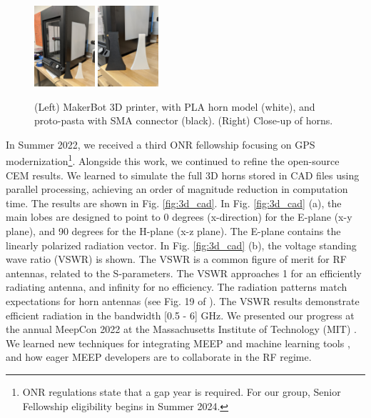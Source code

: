 \documentclass[../../main.tex]{subfiles}
\begin{document}
\label{sec:fac_equip_res}

\begin{figure}[hb]
\centering
\includegraphics[width=0.2\textwidth]{figures/3dprinter.jpg}
\includegraphics[width=0.2\textwidth]{figures/3dprinter_2.jpg}
\caption{\label{fig:3d_print_fac} (Left) MakerBot 3D printer, with PLA horn model (white), and  proto-pasta with SMA connector (black). (Right) Close-up of horns.}
\end{figure}


In Summer 2022, we received a third ONR fellowship focusing on GPS modernization\footnote{ONR regulations state that a gap year is required.  For our group, Senior Fellowship eligibility begins in Summer 2024.}.  Alongside this work, we continued to refine the open-source CEM results.  We learned to simulate the full 3D horns stored in CAD files using parallel processing, achieving an order of magnitude reduction in computation time.  The results are shown in Fig. \ref{fig:3d_cad}.  In Fig. \ref{fig:3d_cad} (a), the main lobes are designed to point to 0 degrees (x-direction) for the E-plane (x-y plane), and 90 degrees for the H-plane (x-z plane).  The E-plane contains the linearly polarized radiation vector.  In Fig. \ref{fig:3d_cad} (b), the voltage standing wave ratio (VSWR) is shown.  The VSWR is a common figure of merit for RF antennas, related to the S-parameters.  The VSWR approaches 1 for an efficiently radiating antenna, and infinity for no efficiency.  The radiation patterns match expectations for horn antennas (see Fig. 19 of \cite{8786183}).  The VSWR results demonstrate efficient radiation in the bandwidth [0.5 - 6] GHz.  We presented our progress at the annual MeepCon 2022 at the Massachusetts Institute of Technology (MIT) \cite{meepcon2022}.  We learned new techniques for integrating MEEP and machine learning tools \cite{meepcon2022_2}, and how eager MEEP developers are to collaborate in the RF regime.  \\ \vspace{2.5mm}
\end{document}
